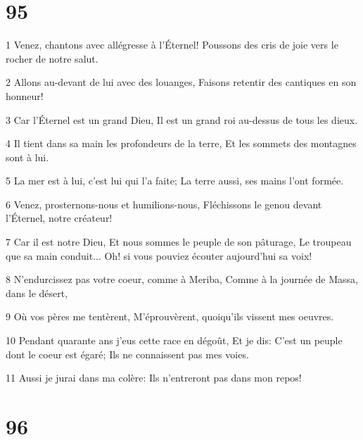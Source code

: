 \chapter{95}

\par 1 Venez, chantons avec allégresse à l'Éternel! Poussons des cris de joie vers le rocher de notre salut.
\par 2 Allons au-devant de lui avec des louanges, Faisons retentir des cantiques en son honneur!
\par 3 Car l'Éternel est un grand Dieu, Il est un grand roi au-dessus de tous les dieux.
\par 4 Il tient dans sa main les profondeurs de la terre, Et les sommets des montagnes sont à lui.
\par 5 La mer est à lui, c'est lui qui l'a faite; La terre aussi, ses mains l'ont formée.
\par 6 Venez, prosternons-nous et humilions-nous, Fléchissons le genou devant l'Éternel, notre créateur!
\par 7 Car il est notre Dieu, Et nous sommes le peuple de son pâturage, Le troupeau que sa main conduit... Oh! si vous pouviez écouter aujourd'hui sa voix!
\par 8 N'endurcissez pas votre coeur, comme à Meriba, Comme à la journée de Massa, dans le désert,
\par 9 Où vos pères me tentèrent, M'éprouvèrent, quoiqu'ils vissent mes oeuvres.
\par 10 Pendant quarante ans j'eus cette race en dégoût, Et je dis: C'est un peuple dont le coeur est égaré; Ils ne connaissent pas mes voies.
\par 11 Aussi je jurai dans ma colère: Ils n'entreront pas dans mon repos!

\chapter{96}

